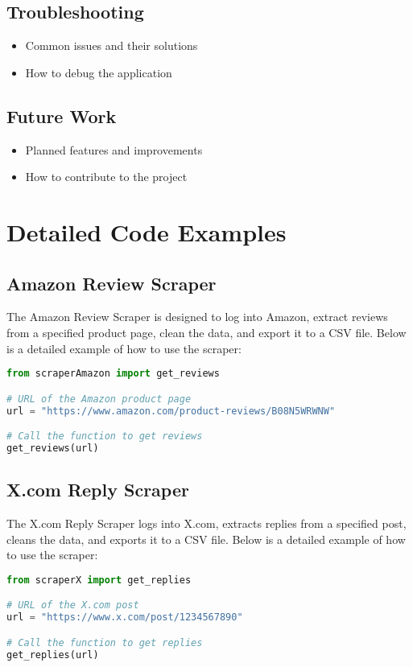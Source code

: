 \documentclass[a4paper]{article}
\begin{document}
\subsection{Troubleshooting}
\begin{itemize}
    \item Common issues and their solutions
    \item How to debug the application
\end{itemize}

\subsection{Future Work}
\begin{itemize}
    \item Planned features and improvements
    \item How to contribute to the project
\end{itemize}

\section{Detailed Code Examples}
\subsection{Amazon Review Scraper}
The Amazon Review Scraper is designed to log into Amazon, extract reviews from a specified product page, clean the data, and export it to a CSV file. Below is a detailed example of how to use the scraper:

\begin{lstlisting}[language=python]
from scraperAmazon import get_reviews

# URL of the Amazon product page
url = "https://www.amazon.com/product-reviews/B08N5WRWNW"

# Call the function to get reviews
get_reviews(url)
\end{lstlisting}

\subsection{X.com Reply Scraper}
The X.com Reply Scraper logs into X.com, extracts replies from a specified post, cleans the data, and exports it to a CSV file. Below is a detailed example of how to use the scraper:

\begin{lstlisting}[language=python]
from scraperX import get_replies

# URL of the X.com post
url = "https://www.x.com/post/1234567890"

# Call the function to get replies
get_replies(url)
\end{lstlisting}
\end{document}
